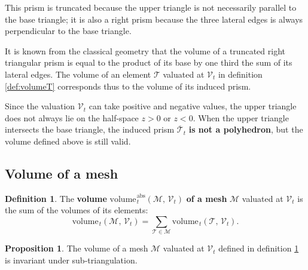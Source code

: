 \documentclass{article}
\theoremstyle{definition}
\newtheorem{defn}{Definition}
\newtheorem{prop}{Proposition}
\newcommand{\MM}{\mathcal{M}}
\newcommand{\VV}{\mathcal{V}}
\newcommand{\TT}{\mathcal{T}}
\newcommand{\vol}{\mathrm{volume\hspace{1pt}}}
\newcommand{\absvol}{\mathrm{volume\hspace{1pt}}^\mathrm{abs}}
\begin{document}
This prism is truncated because the upper triangle is not necessarily parallel to the base triangle; it is also a right prism because the three lateral edges is always perpendicular to the base triangle.

It is known from the classical geometry that the volume of a truncated right triangular prism is equal to the product of its base by one third the sum of its lateral edges. The volume of an element $\TT$ valuated at $\VV_t$ in definition \ref{def:volumeT} corresponds thus to the volume of its induced prism.

Since the valuation $\VV_t$ can take positive and negative values, the upper triangle does not always lie on the half-space $z >0$ or $z<0$. When the upper triangle intersects the base triangle, the induced prism $\overline{\TT}_t$ \textbf{is not a polyhedron}, but the volume defined above is still valid.

\subsection{Volume of a mesh}
\begin{defn}
The \textbf{volume} $\absvol_t(\MM,\,\VV_t)$ \textbf{of a mesh} $\MM$ valuated at $\VV_t$ is the sum of the volumes of its elements:
\[\vol_t(\MM,\,\VV_t) = \sum_{\TT\in\MM}\vol_t(\TT,\,\VV_t).\]
\label{def:VolumeM}\end{defn}

\begin{prop}
The volume of a mesh $\MM$ valuated at $\VV_t$ defined in definition \ref{def:VolumeM} is invariant under sub-triangulation.\label{prop:volume-invariant}
\end{prop}
\end{document}
